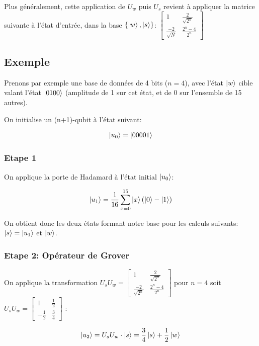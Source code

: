 Plus généralement, cette application de $U_w$ puis $U_s$ revient à appliquer la matrice suivante à l'état d'entrée, dans la base $\{\ket{w}, \ket{s}\}$:
$
\begin{bmatrix}
    1 & \frac{2}{\sqrt{2^n}} \\ \frac{-2}{\sqrt{N}} & \frac{2^n - 4}{2^n}
\end{bmatrix}
$

\subsection{Exemple}
Prenons par exemple une base de données de 4 bits ($n=4$), avec l'état $\ket{w}$ cible valant l'état $\ket{0100}$ (amplitude de 1 sur cet état, et de 0 sur l'ensemble de 15 autres).

On initialise un (n+1)-qubit à l'état suivant:

\begin{align}
  \ket{u_0} = \ket{00001}
\end{align}

\subsubsection*{Etape 1}
On applique la porte de Hadamard à l'état initial $\ket{u_0}$:

\begin{align}
  \ket{u_1} = \frac{1}{16} \displaystyle\sum_{x=0}^{15} \ket{x}(\ket{0} - \ket{1})
\end{align}

On obtient donc les deux états formant notre base pour les calculs suivants: $\ket{s} = \ket{u_1}$ et $\ket{w}$.

\subsubsection*{Etape 2: Opérateur de Grover}

On applique la transformation $U_sU_w = \begin{bmatrix}
  1 & \frac{2}{\sqrt{2^n}} \\ \frac{-2}{\sqrt{2^n}} & \frac{2^n-4}{2^n}
\end{bmatrix}$ pour $n=4$ soit $U_sU_w = \begin{bmatrix}
  1 & \frac{1}{2} \\ -\frac{1}{2} & \frac{3}{4}
\end{bmatrix}$ :

\begin{align}
  \ket{u_2} = U_sU_w \cdot \ket{s} = \frac{3}{4}\ket{s} + \frac{1}{2}\ket{w}
\end{align}

